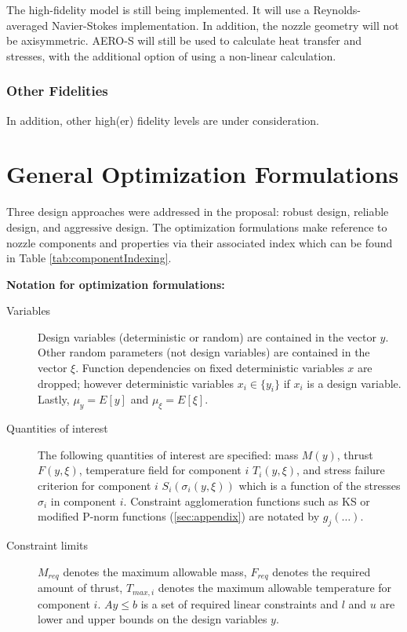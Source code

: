 \documentclass{article}
\begin{document}
The high-fidelity model is still being implemented. It will use a Reynolds-averaged Navier-Stokes implementation. In addition, the nozzle geometry will not be axisymmetric. AERO-S will still be used to calculate heat transfer and stresses, with the additional option of using a non-linear calculation.

\subsubsection{Other Fidelities}

In addition, other high(er) fidelity levels are under consideration.

\section{General Optimization Formulations} \label{sec:generalOptimizationFormulations}

Three design approaches were addressed in the proposal: robust design, reliable design, and aggressive design. The optimization formulations make reference to nozzle components and properties via their associated index which can be found in Table \ref{tab:componentIndexing}. 

\begin{mdframed}
\textbf{Notation for optimization formulations:}  
\begin{description}
\item[Variables] Design variables (deterministic or random) are contained in the vector $y$. Other random parameters (not design variables) are contained in the vector $\xi$. Function dependencies on fixed deterministic variables $x$ are dropped; however deterministic variables $x_i \in \{y_i\}$ if $x_i$ is a design variable. Lastly, $\mu_y = E[y]$ and $\mu_{\xi} = E[\xi]$.

\item[Quantities of interest] The following quantities of interest are specified: mass $M(y)$, thrust $F(y,\xi)$, temperature field for component $i$ $T_i(y,\xi)$, and stress failure criterion for component $i$ $S_i (\sigma_i(y,\xi) )$ which is a function of the stresses $\sigma_i$ in component $i$. Constraint agglomeration functions such as KS or modified P-norm functions (\ref{sec:appendix}) are notated by $g_j(\ldots)$. 

\item[Constraint limits] $M_{req}$ denotes the maximum allowable mass, $F_{req}$ denotes the required amount of thrust, $T_{max,i}$ denotes the maximum allowable temperature for component $i$. $Ay \leq b$ is a set of required linear constraints and $l$ and $u$ are lower and upper bounds on the design variables $y$.
\end{description}
\end{mdframed}
\end{document}
